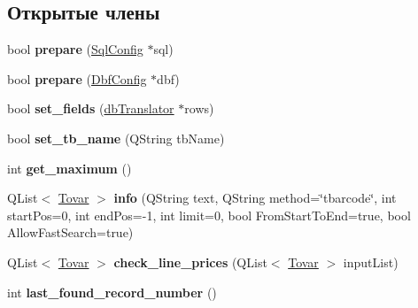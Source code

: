 \subsection*{Открытые члены}
\begin{DoxyCompactItemize}
\item 
\hypertarget{class_tinformer_a6aeaa5f47e1e2d0b63919324b5225749}{bool {\bfseries prepare} (\hyperlink{class_sql_config}{\-Sql\-Config} $\ast$sql)}\label{class_tinformer_a6aeaa5f47e1e2d0b63919324b5225749}

\item 
\hypertarget{class_tinformer_a34e8bc78d333b5a4ddb1a5eb1e90d455}{bool {\bfseries prepare} (\hyperlink{class_dbf_config}{\-Dbf\-Config} $\ast$dbf)}\label{class_tinformer_a34e8bc78d333b5a4ddb1a5eb1e90d455}

\item 
\hypertarget{class_tinformer_a02412fac485b95c1a02cbb368fa063b0}{bool {\bfseries set\-\_\-fields} (\hyperlink{classdb_translator}{db\-Translator} $\ast$rows)}\label{class_tinformer_a02412fac485b95c1a02cbb368fa063b0}

\item 
\hypertarget{class_tinformer_ad957fbc889630a50ee3d7a75b11c3bd1}{bool {\bfseries set\-\_\-tb\-\_\-name} (\-Q\-String tb\-Name)}\label{class_tinformer_ad957fbc889630a50ee3d7a75b11c3bd1}

\item 
\hypertarget{class_tinformer_aae000f924cd19bb5519e4a3f190ac5ff}{int {\bfseries get\-\_\-maximum} ()}\label{class_tinformer_aae000f924cd19bb5519e4a3f190ac5ff}

\item 
\hypertarget{class_tinformer_a8eb3476d5039ebddc5ceedb1a8186f07}{\-Q\-List$<$ \hyperlink{struct_tovar}{\-Tovar} $>$ {\bfseries info} (\-Q\-String text, \-Q\-String method=\char`\"{}tbarcode\char`\"{}, int start\-Pos=0, int end\-Pos=-\/1, int limit=0, bool \-From\-Start\-To\-End=true, bool \-Allow\-Fast\-Search=true)}\label{class_tinformer_a8eb3476d5039ebddc5ceedb1a8186f07}

\item 
\hypertarget{class_tinformer_a77fce08063bedb58a5fa9a3ce1c5664a}{\-Q\-List$<$ \hyperlink{struct_tovar}{\-Tovar} $>$ {\bfseries check\-\_\-line\-\_\-prices} (\-Q\-List$<$ \hyperlink{struct_tovar}{\-Tovar} $>$ input\-List)}\label{class_tinformer_a77fce08063bedb58a5fa9a3ce1c5664a}

\item 
\hypertarget{class_tinformer_af8aa4dc475b8fc545ff8817b7d681409}{int {\bfseries last\-\_\-found\-\_\-record\-\_\-number} ()}\label{class_tinformer_af8aa4dc475b8fc545ff8817b7d681409}


\end{DoxyCompactItemize}
